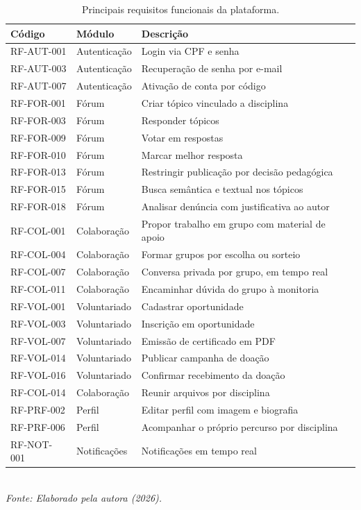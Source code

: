 \begin{table}[!ht]
\centering
\caption{Principais requisitos funcionais da plataforma.}
\label{tab-requisitos}
\scriptsize
\begin{tabular}{|l|l|l|}
\hline
\textbf{Código} & \textbf{Módulo} & \textbf{Descrição} \\
\hline
RF-AUT-001 & Autenticação & Login via CPF e senha \\
\hline
RF-AUT-003 & Autenticação & Recuperação de senha por e-mail \\
\hline
RF-AUT-007 & Autenticação & Ativação de conta por código \\
\hline
RF-FOR-001 & Fórum & Criar tópico vinculado a disciplina \\
\hline
RF-FOR-003 & Fórum & Responder tópicos \\
\hline
RF-FOR-009 & Fórum & Votar em respostas \\
\hline
RF-FOR-010 & Fórum & Marcar melhor resposta \\
\hline
RF-FOR-013 & Fórum & Restringir publicação por decisão pedagógica \\
\hline
RF-FOR-015 & Fórum & Busca semântica e textual nos tópicos \\
\hline
RF-FOR-018 & Fórum & Analisar denúncia com justificativa ao autor \\
\hline
RF-COL-001 & Colaboração & Propor trabalho em grupo com material de apoio \\
\hline
RF-COL-004 & Colaboração & Formar grupos por escolha ou sorteio \\
\hline
RF-COL-007 & Colaboração & Conversa privada por grupo, em tempo real \\
\hline
RF-COL-011 & Colaboração & Encaminhar dúvida do grupo à monitoria \\
\hline
RF-VOL-001 & Voluntariado & Cadastrar oportunidade \\
\hline
RF-VOL-003 & Voluntariado & Inscrição em oportunidade \\
\hline
RF-VOL-007 & Voluntariado & Emissão de certificado em PDF \\
\hline
RF-VOL-014 & Voluntariado & Publicar campanha de doação \\
\hline
RF-VOL-016 & Voluntariado & Confirmar recebimento da doação \\
\hline
RF-COL-014 & Colaboração & Reunir arquivos por disciplina \\
\hline
RF-PRF-002 & Perfil & Editar perfil com imagem e biografia \\
\hline
RF-PRF-006 & Perfil & Acompanhar o próprio percurso por disciplina \\
\hline
RF-NOT-001 & Notificações & Notificações em tempo real \\
\hline
\end{tabular}
\\ \vspace{4pt}
\textit{\scriptsize Fonte: Elaborado pela autora (2026).}
\end{table}

